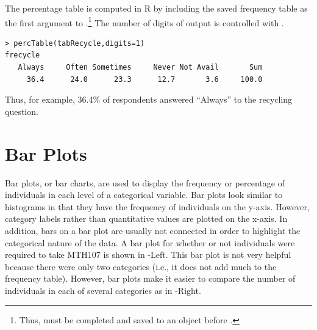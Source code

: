 \documentclass[10pt,openany]{book}\usepackage[]{graphicx}\usepackage[]{color}
\makeatletter
\newenvironment{kframe}{%
 \def\at@end@of@kframe{}%
 \ifinner\ifhmode%
  \def\at@end@of@kframe{\end{minipage}}%
  \begin{minipage}{\columnwidth}%
 \fi\fi%
 \def\FrameCommand##1{\hskip\@totalleftmargin \hskip-\fboxsep
 \colorbox{shadecolor}{##1}\hskip-\fboxsep
     \hskip-\linewidth \hskip-\@totalleftmargin \hskip\columnwidth}%
 \MakeFramed {\advance\hsize-\width
   \@totalleftmargin\z@ \linewidth\hsize
   \@setminipage}}%
 {\par\unskip\endMakeFramed%
 \at@end@of@kframe}
\newenvironment{knitrout}{}{} %
\makeatother
\begin{document}
The percentage table is computed in R by including the saved frequency table as the first argument to .\footnote{Thus,  must be completed and saved to an object before .}  The number of digits of output is controlled with .
\begin{knitrout}
\color{fgcolor}\begin{kframe}
\begin{verbatim}
> percTable(tabRecycle,digits=1)
frecycle
   Always     Often Sometimes     Never Not Avail       Sum 
     36.4      24.0      23.3      12.7       3.6     100.0 
\end{verbatim}
\end{kframe}
\end{knitrout}
Thus, for example, 36.4\% of respondents answered ``Always'' to the recycling question.

\section{Bar Plots}
Bar plots, or bar charts, are used to display the frequency or percentage of individuals in each level of a categorical variable.  Bar plots look similar to histograms in that they have the frequency of individuals on the y-axis.  However, category labels rather than quantitative values are plotted on the x-axis.  In addition, bars on a bar plot are usually not connected in order to highlight the categorical nature of the data.  A bar plot for whether or not individuals were required to take MTH107 is shown in -Left.  This bar plot is not very helpful because there were only two categories (i.e., it does not add much to the frequency table).  However, bar plots make it easier to compare the number of individuals in each of several categories as in -Right.
\end{document}
